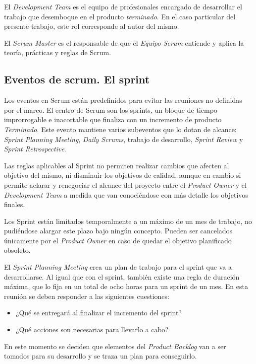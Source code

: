 El \textit{Development Team} es el equipo de profesionales encargado de desarrollar el trabajo que desemboque en el producto \textit{terminado}. En el caso particular del presente trabajo, este rol corresponde al autor del mismo.

El \textit{Scrum Master} es el responsable de que el \textit{Equipo Scrum} entiende y aplica la teoría, prácticas y reglas de Scrum.

\subsection{Eventos de scrum. El sprint}
Los eventos en Scrum están predefinidos para evitar las reuniones no definidas por el marco. El centro de Scrum son los sprints, un bloque de tiempo improrrogable e inacortable que finaliza con un incremento de producto \textit{Terminado}. Este evento mantiene varios subeventos que lo dotan de alcance: \textit{Sprint Planning Meeting}, \textit{Daily Scrums}, trabajo de desarrollo, \textit{Sprint Review} y \textit{Sprint Retrospective}.

Las reglas aplicables al Sprint no permiten realizar cambios que afecten al objetivo del mismo, ni disminuir los objetivos de calidad, aunque en cambio si permite aclarar y renegociar el alcance del proyecto entre el \textit{Product Owner} y el \textit{Development Team} a medida que van conociéndose con más detalle los objetivos finales.

Los Sprint están limitados temporalmente a un máximo de un mes de trabajo, no pudiéndose alargar este plazo bajo ningún concepto. Pueden ser cancelados únicamente por el \textit{Product Owner} en caso de quedar el objetivo planificado obsoleto.

El \textit{Sprint Planning Meeting} crea un plan de trabajo para el sprint que va a desarrollarse. Al igual que con el sprint, también existe una regla de duración máxima, que lo fija en un total de ocho horas para un sprint de un mes.
En esta reunión se deben responder a las siguientes cuestiones:
\begin{itemize}[label={$\bullet$},labelindent=\parindent,leftmargin=2cm]
	\item ¿Qué se entregará al finalizar el incremento del sprint?
	\item ¿Qué acciones son necesarias para llevarlo a cabo?
\end{itemize}
En este momento se deciden que elementos del \textit{Product Backlog} van a ser tomados para su desarrollo y se traza un plan para conseguirlo.

